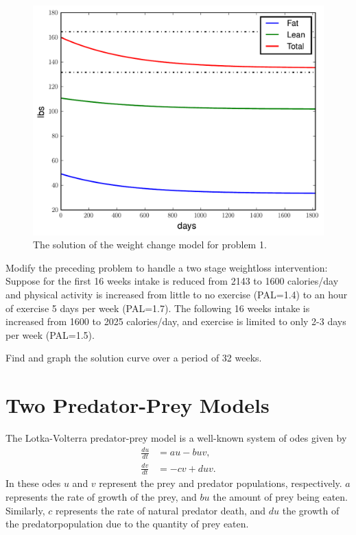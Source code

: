 \begin{figure}
\centering
\includegraphics[width=\textwidth]{weightloss.pdf}
\caption{The solution of the weight change model for problem 1.}
\label{fig:weightloss}
\end{figure}

\begin{problem}
Modify the preceding problem to handle a two stage weightloss intervention:
Suppose for the first 16 weeks intake is reduced from 2143 to 1600 calories/day and physical activity is increased from little to no exercise (PAL=1.4) to an hour of exercise 5 days per week (PAL=1.7).
The following 16 weeks intake is increased from 1600 to 2025 calories/day, and exercise is limited to only 2-3 days per week (PAL=1.5).

Find and graph the solution curve over a period of 32 weeks.
\end{problem}

\section*{Two Predator-Prey Models}
The Lotka-Volterra predator-prey model is a well-known 
system of odes given by 
\begin{align*}
	\frac{du}{dt} &= au - buv,\\
	\frac{dv}{dt} &= -cv + duv.
\end{align*}
In these odes $u$ and $v$ represent the prey and predator populations, respectively. $a$ represents the rate of growth of the prey, and $bu$ the amount of prey being eaten.
Similarly, $c$ represents the rate of natural predator death, and $du$ the growth of the predatorpopulation due to the quantity of prey eaten.

